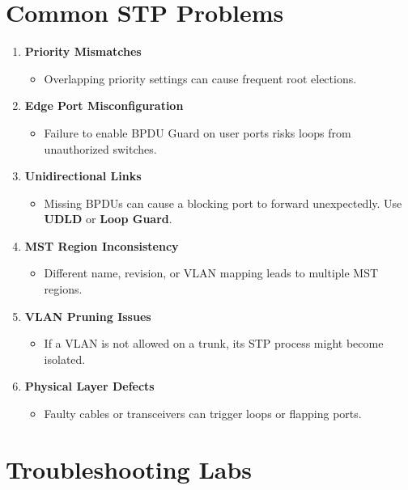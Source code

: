 \documentclass[a4paper]{report}
\begin{document}
\section{Common STP Problems}
\begin{enumerate}
    \item \textbf{Priority Mismatches}
    \begin{itemize}
        \item Overlapping priority settings can cause frequent root elections.
    \end{itemize}
    \item \textbf{Edge Port Misconfiguration}
    \begin{itemize}
        \item Failure to enable BPDU Guard on user ports risks loops from unauthorized switches.
    \end{itemize}
    \item \textbf{Unidirectional Links}
    \begin{itemize}
        \item Missing BPDUs can cause a blocking port to forward unexpectedly. Use \textbf{UDLD} or \textbf{Loop Guard}.
    \end{itemize}
    \item \textbf{MST Region Inconsistency}
    \begin{itemize}
        \item Different name, revision, or VLAN mapping leads to multiple MST regions.
    \end{itemize}
    \item \textbf{VLAN Pruning Issues}
    \begin{itemize}
        \item If a VLAN is not allowed on a trunk, its STP process might become isolated.
    \end{itemize}
    \item \textbf{Physical Layer Defects}
    \begin{itemize}
        \item Faulty cables or transceivers can trigger loops or flapping ports.
    \end{itemize}
\end{enumerate}

\section{Troubleshooting Labs}
\end{document}
